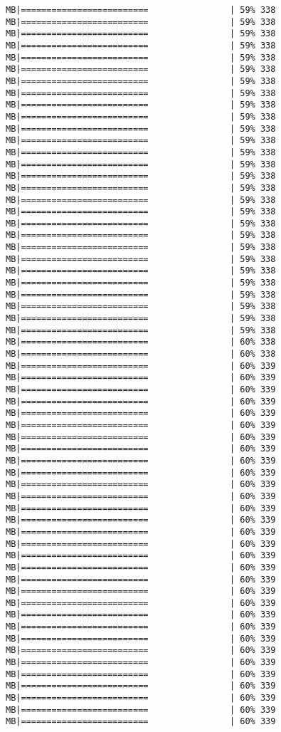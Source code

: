 \documentclass[
]{article}
\begin{document}
\begin{verbatim}
MB|=========================                | 59% 338 MB|=========================                | 59% 338 MB|=========================                | 59% 338 MB|=========================                | 59% 338 MB|=========================                | 59% 338 MB|=========================                | 59% 338 MB|=========================                | 59% 338 MB|=========================                | 59% 338 MB|=========================                | 59% 338 MB|=========================                | 59% 338 MB|=========================                | 59% 338 MB|=========================                | 59% 338 MB|=========================                | 59% 338 MB|=========================                | 59% 338 MB|=========================                | 59% 338 MB|=========================                | 59% 338 MB|=========================                | 59% 338 MB|=========================                | 59% 338 MB|=========================                | 59% 338 MB|=========================                | 59% 338 MB|=========================                | 59% 338 MB|=========================                | 59% 338 MB|=========================                | 59% 338 MB|=========================                | 59% 338 MB|=========================                | 59% 338 MB|=========================                | 59% 338 MB|=========================                | 59% 338 MB|=========================                | 59% 338 MB|=========================                | 60% 338 MB|=========================                | 60% 338 MB|=========================                | 60% 339 MB|=========================                | 60% 339 MB|=========================                | 60% 339 MB|=========================                | 60% 339 MB|=========================                | 60% 339 MB|=========================                | 60% 339 MB|=========================                | 60% 339 MB|=========================                | 60% 339 MB|=========================                | 60% 339 MB|=========================                | 60% 339 MB|=========================                | 60% 339 MB|=========================                | 60% 339 MB|=========================                | 60% 339 MB|=========================                | 60% 339 MB|=========================                | 60% 339 MB|=========================                | 60% 339 MB|=========================                | 60% 339 MB|=========================                | 60% 339 MB|=========================                | 60% 339 MB|=========================                | 60% 339 MB|=========================                | 60% 339 MB|=========================                | 60% 339 MB|=========================                | 60% 339 MB|=========================                | 60% 339 MB|=========================                | 60% 339 MB|=========================                | 60% 339 MB|=========================                | 60% 339 MB|=========================                | 60% 339 MB|=========================                | 60% 339 MB|=========================                | 60% 339 MB|=========================                | 60% 339 
\end{verbatim}
\end{document}
